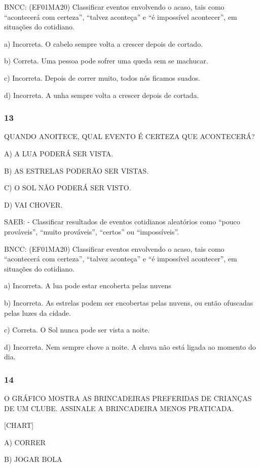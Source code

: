 BNCC: (EF01MA20) Classificar eventos envolvendo o acaso, tais como
``acontecerá com certeza'', ``talvez aconteça'' e ``é impossível
acontecer'', em situações do cotidiano.

a) Incorreta. O cabelo sempre volta a crescer depois de cortado.

b) Correta. Uma pessoa pode sofrer uma queda sem se machucar.

c) Incorreta. Depois de correr muito, todos nós ficamos suados.

d) Incorreta. A unha sempre volta a crescer depois de cortada.

\subsubsection{13 }\label{section-129}

QUANDO ANOITECE, QUAL EVENTO É CERTEZA QUE ACONTECERÁ?

A) A LUA PODERÁ SER VISTA.

B) AS ESTRELAS PODERÃO SER VISTAS.

C) O SOL NÃO PODERÁ SER VISTO.

D) VAI CHOVER.

SAEB: - Classificar resultados de eventos cotidianos aleatórios como
``pouco prováveis'', ``muito prováveis'', ``certos'' ou ``impossíveis''.

BNCC: (EF01MA20) Classificar eventos envolvendo o acaso, tais como
``acontecerá com certeza'', ``talvez aconteça'' e ``é impossível
acontecer'', em situações do cotidiano.

a) Incorreta. A lua pode estar encoberta pelas nuvens

b) Incorreta. As estrelas podem ser encobertas pelas nuvens, ou então
ofuscadas pelas luzes da cidade.

c) Correta. O Sol nunca pode ser vista a noite.

d) Incorreta. Nem sempre chove a noite. A chuva não está ligada ao
momento do dia.

\subsubsection{14 }\label{section-130}

O GRÁFICO MOSTRA AS BRINCADEIRAS PREFERIDAS DE CRIANÇAS DE UM CLUBE.
ASSINALE A BRINCADEIRA MENOS PRATICADA.

{{[}CHART{]}}

A) CORRER

B) JOGAR BOLA

